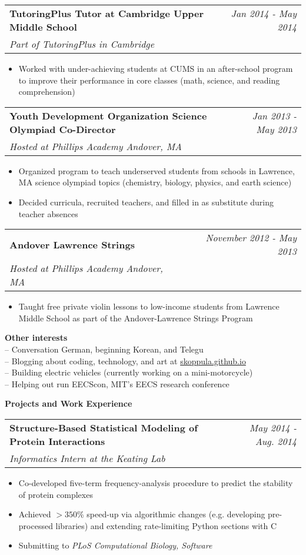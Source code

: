 \documentclass[letterpaper,11pt]{article}
\makeatletter
\newcommand{\resitem}[1]{\item[--] #1 \vspace{-6pt}}
\newcommand{\ressubheading}[4]{
\begin{tabular*}{7in}{l@{\extracolsep{\fill}}r}
	\textbf{#1} & \textit{#2} \\
	\textit{#3} & \textit{#4}\\
\end{tabular*}\vspace{-6pt}}
\makeatother
\begin{document}
\ressubheading{TutoringPlus Tutor at Cambridge Upper Middle School}{Jan 2014 - May 2014}{Part of TutoringPlus in Cambridge}{}
	\begin{itemize}
			\resitem{Worked with under-achieving students at CUMS in an after-school program to improve their performance in core classes (math, science, and reading comprehension)}
	\end{itemize}
\vspace{0.05in}
\ressubheading{Youth Development Organization Science Olympiad Co-Director}{Jan 2013 - May 2013}{Hosted at Phillips Academy Andover, MA}{}
	\begin{itemize}
			\resitem{Organized program to teach underserved students from schools in Lawrence, MA science olympiad topics (chemistry, biology, physics, and earth science)}
			\resitem{Decided curricula, recruited teachers, and filled in as substitute during teacher absences}
	\end{itemize}
\ressubheading{Andover Lawrence Strings}{November 2012 - May 2013}{Hosted at Phillips Academy Andover, MA}{}
	\begin{itemize}
			\resitem{Taught free private violin lessons to low-income students from Lawrence Middle School as part of the Andover-Lawrence Strings Program}
	\end{itemize}
\vspace{0.1in}
\large \textbf{Other interests\vspace{1mm}} \normalsize \\
\hspace{2mm} -- Conversation German, beginning Korean, and Telegu \\
\hspace{2mm} -- Blogging about coding, technology, and art at \href{http://www.skoppula.github.io}{skoppula.github.io}\\
\hspace{2mm} -- Building electric vehicles (currently working on a mini-motorcycle) \\
\hspace{2mm} -- Helping out run EECScon, MIT's EECS research conference \\

\vspace{0.1in}

\large \textbf{Projects and Work Experience\vspace{2mm}} \normalsize

	\ressubheading{Structure-Based Statistical Modeling of Protein Interactions}{May 2014 - Aug. 2014}{Informatics Intern at the Keating Lab}{}
	\begin{itemize}
		\resitem{Co-developed five-term frequency-analysis procedure to predict the stability of protein complexes}
		\resitem{Achieved $>350$\% speed-up via algorithmic changes (e.g. developing pre-processed libraries) and extending rate-limiting Python sections with C}
		\resitem{Submitting to \textit{PLoS Computational Biology, Software}}
	\end{itemize}
\end{document}
